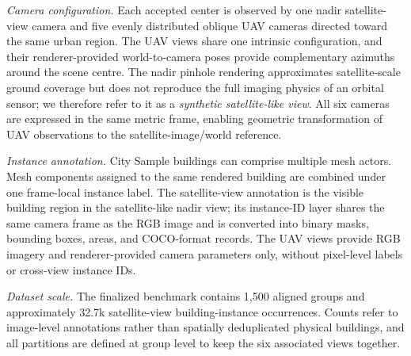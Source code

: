 \documentclass[letterpaper,journal]{IEEEtran}
\begin{document}
\noindent\textit{Camera configuration.}
Each accepted center is observed by one nadir satellite-view camera and five evenly distributed
oblique UAV cameras directed toward the same urban region. The UAV views share one intrinsic
configuration, and their renderer-provided world-to-camera poses provide complementary azimuths
around the scene centre. The nadir pinhole rendering approximates satellite-scale ground coverage but
does not reproduce the full imaging physics of an orbital sensor; we therefore refer to it as a
\emph{synthetic satellite-like view}. All six cameras are expressed in the same metric frame,
enabling geometric transformation of UAV observations to the satellite-image/world reference.

\noindent\textit{Instance annotation.}
City Sample buildings can comprise multiple mesh actors. Mesh components assigned to the same
rendered building are combined under one frame-local instance label. The satellite-view annotation is
the visible building region in the satellite-like nadir view; its instance-ID layer shares the
same camera frame as the RGB image and is converted into binary masks, bounding boxes, areas,
and COCO-format records. The UAV views provide RGB imagery and renderer-provided camera
parameters only, without pixel-level labels or cross-view instance IDs.

\noindent\textit{Dataset scale.}
The finalized benchmark contains 1,500 aligned groups and approximately 32.7k satellite-view
building-instance occurrences. Counts refer to image-level annotations rather than spatially
deduplicated physical buildings, and all partitions are defined at group level to keep the six
associated views together.
\end{document}
